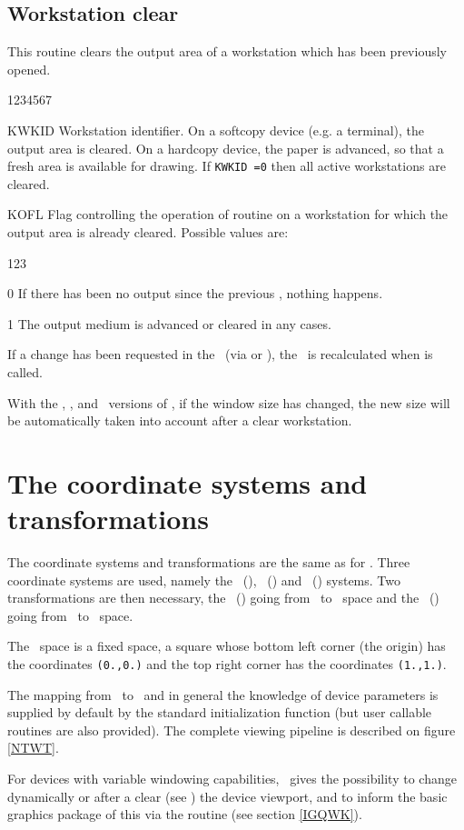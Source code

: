 \subsection{Workstation clear}
\Action
This routine clears the output area of a workstation which has been previously
opened.
\Pdesc
\begin{DLtt}{1234567}
\item[KWKID] Workstation identifier. On a softcopy device (e.g. a terminal), the
             output area is cleared. On a hardcopy device, the paper is
	     advanced, so that a fresh area is available for drawing. If
	     {\tt KWKID =0} then all active workstations are cleared.
\item[KOFL] Flag controlling the operation of routine  on a
            workstation for which the output area is already cleared. Possible
	    values are:
\begin{DLtt}{123}
\item[0] If there has been no output since the previous ,
         nothing happens.
\item[1] The output medium is advanced or cleared in any cases.
\end{DLtt}
\end{DLtt}
If a change has been requested in the \WT~(via  or ),
the \WT~is recalculated when  is called.

With the \GPR, \GL, and ~versions of \HIGZ, if the window size has changed,
the new size will be automatically taken into account after a clear workstation.
%
%

\section{The coordinate systems and transformations}
The coordinate systems and transformations are the same as for \GKS.
Three coordinate systems are used, namely the \WC~(\wc), \NDC~(\ndc) and
\DC~(\dc) systems. Two transformations are then necessary, the \NT~(\nt) going
from \WC~to \NDC~space and the \WT~(\wt) going from \NDC~to \DC~space.
\par
The \NDC~space is a fixed space, a square whose bottom left corner
(the origin) has the coordinates {\tt(0.,0.)} and the top right corner
has the coordinates {\tt(1.,1.)}.
\par
The mapping from \NDC~to \DC~and in general the knowledge of
device parameters is supplied by default by the standard initialization
function (but user callable routines are also provided).
The complete viewing pipeline is described on figure \ref{NTWT}.
\par
For devices with variable windowing capabilities, \HIGZ~gives the possibility
to change dynamically or after a clear (see ) the device viewport,
and to inform the basic graphics package of this via the routine 
(see section \ref{IGQWK}).


